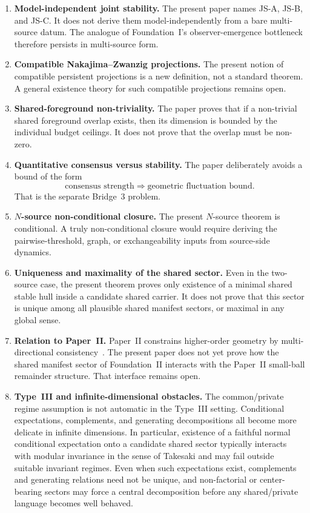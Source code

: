 \documentclass[12pt]{article}
\theoremstyle{definition}
\theoremstyle{remark}
\begin{document}
\begin{enumerate}
\item \textbf{Model-independent joint stability.} The present paper
  names JS-A, JS-B, and JS-C. It does not derive them model-independently
  from a bare multi-source datum. The analogue of Foundation~I's
  observer-emergence bottleneck therefore persists in multi-source form.

\item \textbf{Compatible Nakajima--Zwanzig projections.} The present
  notion of compatible persistent projections is a new definition, not a
  standard theorem. A general existence theory for such compatible
  projections remains open.

\item \textbf{Shared-foreground non-triviality.} The paper proves that
  if a non-trivial shared foreground overlap exists, then its dimension
  is bounded by the individual budget ceilings. It does not prove that
  the overlap must be non-zero.

\item \textbf{Quantitative consensus versus stability.} The paper
  deliberately avoids a bound of the form
  \[
  \text{consensus strength}
  \Longrightarrow
  \text{geometric fluctuation bound}.
  \]
  That is the separate Bridge~3 problem.

\item \textbf{\(N\)-source non-conditional closure.} The present
  \(N\)-source theorem is conditional. A truly non-conditional closure
  would require deriving the pairwise-threshold, graph, or
  exchangeability inputs from source-side dynamics.

\item \textbf{Uniqueness and maximality of the shared sector.} Even in
  the two-source case, the present theorem proves only existence of a
  minimal shared stable hull inside a candidate shared carrier. It does
  not prove that this sector is unique among all plausible shared
  manifest sectors, or maximal in any global sense.

\item \textbf{Relation to Paper~II.} Paper~II constrains higher-order
  geometry by multi-directional consistency~\cite{PaperII}. The present
  paper does not yet prove how the shared manifest sector of
  Foundation~II interacts with the Paper~II small-ball remainder
  structure. That interface remains open.

\item \textbf{Type~III and infinite-dimensional obstacles.} The
  common/private regime assumption is not automatic in the Type~III
  setting. Conditional expectations, complements, and generating
  decompositions all become more delicate in infinite dimensions. In
  particular, existence of a faithful normal conditional expectation
  onto a candidate shared sector typically interacts with modular
  invariance in the sense of Takesaki and may fail outside suitable
  invariant regimes. Even when such expectations exist, complements and
  generating relations need not be unique, and non-factorial or
  center-bearing sectors may force a central decomposition before any
  shared/private language becomes well behaved.
\end{enumerate}
\end{document}

